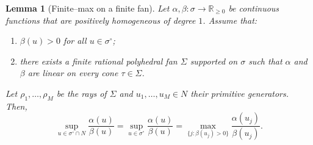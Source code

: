 \documentclass[12pt]{amsart}
\newcommand{\RR}{\mathbb{R}}
\theoremstyle{plain}
\newtheorem{lemma}[theorem]{Lemma}
\theoremstyle{definition}
\numberwithin{equation}{section}
\begin{document}

\begin{lemma}[Finite--max on a finite fan] \label{prop:finite-max-fan}
	Let $\alpha,\beta:\sigma\to\RR_{\ge0}$ be continuous functions that are positively homogeneous of degree $1$. Assume that: \begin{enumerate} 
		\item $\beta(u)>0$ for all $u\in\sigma^\circ$;
		\item there exists a finite rational polyhedral fan $\Sigma$ supported on $\sigma$ such that $\alpha$ and $\beta$ are linear on every cone $\tau\in\Sigma$.
	\end{enumerate}
	Let $\rho_1,\dots,\rho_M$ be the rays of $\Sigma$ and $u_1,\dots,u_M\in N$ their primitive generators. Then,
	$$
	\sup_{u\in\sigma^\circ\cap N}\frac{\alpha(u)}{\beta(u)}
	=
	\sup_{u\in\sigma^\circ}\frac{\alpha(u)}{\beta(u)}
	=
	\max_{\{j:\beta(u_j)>0\}}\frac{\alpha(u_j)}{\beta(u_j)}.
	$$
\end{lemma}
\end{document}
